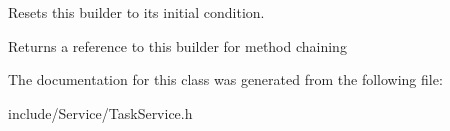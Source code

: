 Resets this builder to its initial condition.

\begin{DoxyReturn}{Returns}
a reference to this builder for method chaining 
\end{DoxyReturn}


The documentation for this class was generated from the following file\+:\begin{DoxyCompactItemize}
\item 
include/\+Service/Task\+Service.\+h\end{DoxyCompactItemize}
